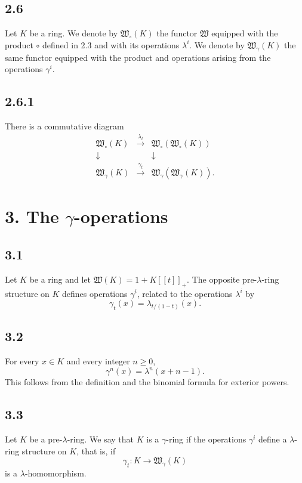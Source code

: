 \documentclass[11pt]{article}
\theoremstyle{plain}
\theoremstyle{definition}
\theoremstyle{remark}
\begin{document}
\subsection*{2.6}
Let $K$ be a ring. We denote by $\mathfrak W_\circ(K)$ the functor $\mathfrak W$ equipped with the product $\circ$ defined in 2.3 and with its operations $\lambda^i$. We denote by $\mathfrak W_\gamma(K)$ the same functor equipped with the product and operations arising from the operations $\gamma^i$.

\subsection*{2.6.1}
There is a commutative diagram
\[
\begin{array}{ccc}
\mathfrak W_\circ(K) & \xrightarrow{\lambda_t} & \mathfrak W_\circ(\mathfrak W_\circ(K))\\
\downarrow && \downarrow\\
\mathfrak W_\gamma(K) & \xrightarrow{\gamma_t} & \mathfrak W_\gamma(\mathfrak W_\gamma(K)).
\end{array}
\]

\section*{3. The $\gamma$-operations}

\subsection*{3.1}
Let $K$ be a ring and let $\mathfrak W(K)=1+K[[t]]_+$. The opposite pre-$\lambda$-ring structure on $K$ defines operations $\gamma^i$, related to the operations $\lambda^i$ by
\begin{equation}\label{eq:3.1}
\gamma_t(x)=\lambda_{t/(1-t)}(x).
\end{equation}

\subsection*{3.2}
For every $x\in K$ and every integer $n\geq 0$,
\begin{equation}\label{eq:3.2}
\gamma^n(x)=\lambda^n(x+n-1).
\end{equation}
This follows from the definition and the binomial formula for exterior powers.

\subsection*{3.3}
Let $K$ be a pre-$\lambda$-ring. We say that $K$ is a $\gamma$-ring if the operations $\gamma^i$ define a $\lambda$-ring structure on $K$, that is, if
\[
\gamma_t:K\longrightarrow \mathfrak W_\gamma(K)
\]
is a $\lambda$-homomorphism.
\end{document}
